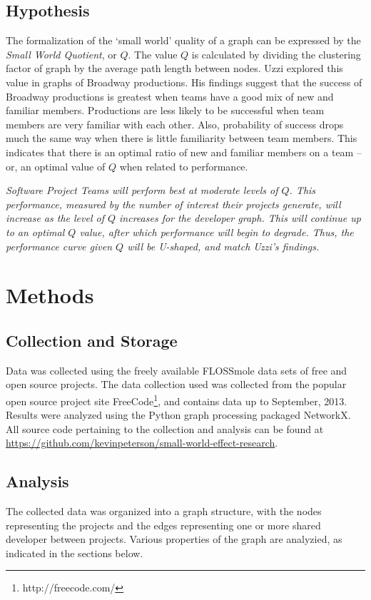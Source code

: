\documentclass{proc}
\begin{document}
\subsection{Hypothesis}
The formalization of the `small world' quality of a graph can be expressed by the \textit{Small World Quotient}, or $Q$\cite{watts1999small,watts1998collective}. The value $Q$ is calculated by dividing the clustering factor of graph by the average path length between nodes. Uzzi explored this value in graphs of Broadway productions\cite{uzzi2005collaboration}. His findings suggest that the success of Broadway productions is greatest when teams have a good mix of new and familiar members. Productions are less likely to be successful when team members are very familiar with each other. Also, probability of success drops much the same way when there is little familiarity between team members. This indicates that there is an optimal ratio of new and familiar members on a team -- or, an optimal value of $Q$ when related to performance.

\textit{Software Project Teams will perform best at moderate levels of $Q$. This performance, measured by the number of interest their projects generate, will increase as the level of $Q$ increases for the developer graph. This will continue up to an optimal $Q$ value, after which performance will begin to degrade. Thus, the performance curve given $Q$ will be U-shaped, and match Uzzi's findings\cite{uzzi2005collaboration}.}

\section{Methods}

\subsection{Collection and Storage}
Data was collected using the freely available FLOSSmole\cite{floss2006} data sets of free and open source projects. The data collection used was collected from the popular open source project site FreeCode\footnote{http://freecode.com/}, and contains data up to September, 2013. Results were analyzed using the Python graph processing packaged NetworkX\cite{hagberg-2008-exploring}. All source code pertaining to the collection and analysis can be found at \url{https://github.com/kevinpeterson/small-world-effect-research}.

\subsection{Analysis}
The collected data was organized into a graph structure, with the nodes representing the projects and the edges representing one or more shared developer between projects. Various properties of the graph are analyzied, as indicated in the sections below.
\end{document}

